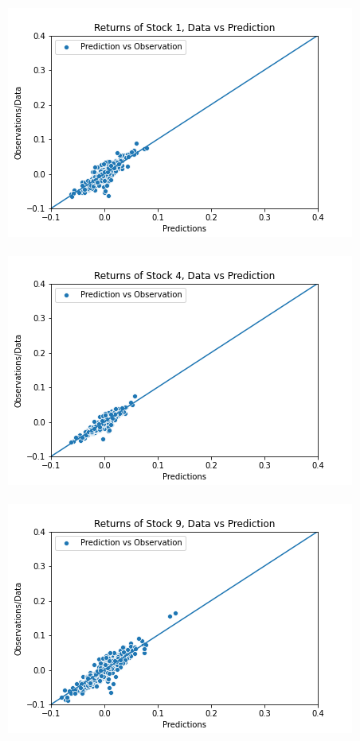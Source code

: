 \begin{figure}%
	\centering
	\begin{subfigure}[l]{0.3\textwidth}
		\includegraphics[width=\textwidth]{img/07_1/N60/Q1_kernel1_stock1_scatter.png}
	\end{subfigure}
	\begin{subfigure}[c]{0.3\textwidth}
		\includegraphics[width=\textwidth]{img/07_1/N60/Q1_kernel1_stock4_scatter.png}
	\end{subfigure}
	\begin{subfigure}[r]{0.3\textwidth}
		\includegraphics[width=\textwidth]{img/07_1/N60/Q1_kernel1_stock9_scatter.png}

\end{subfigure}
\end{figure}
